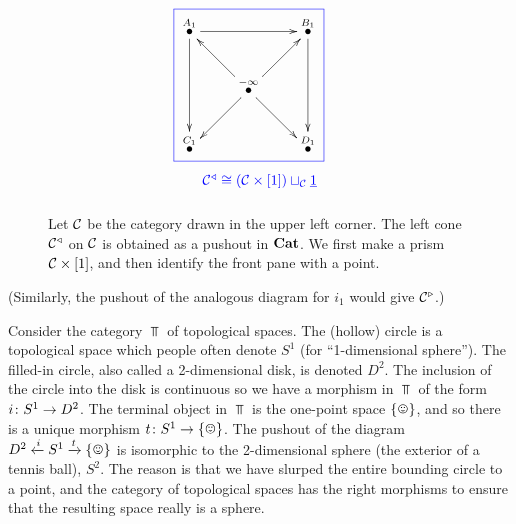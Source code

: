 \documentclass[CT4S-EN-RU]{subfiles}
\begin{document}
\begin{exampleENG}
\begin{figure}[H]
$$\parbox{1.7in}{\cfbox{blue}{\parbox{1.7in}{
\xymatrix{
\LMO{A_1}\ar[rr]\ar[dd]&&\LMO{B_1}\ar[dd]\\
&\LMO{-\infty}\ar[ur]\ar[dr]\ar[ul]\ar[dl]\\
\LMO{C_1}&&\LMO{D_1}}}}\begin{center}\color{blue}{$\mcC\lcone\iso(\mcC\times[1])\sqcup_{\mcC}\ul{1}$}\end{center}}
$$
\caption{Let $\mathcal{C}$ be the category drawn in the upper left corner. The left cone $\mathcal{C}^\triangleleft$ on $\mathcal{C}$ is obtained as a pushout in ${\mathbf{Cat}}$. We first make a prism $\mathcal{C}\times[1]$, and then identify the front pane with a point.}
\label{fig:left cone}
\end{figure}
(Similarly, the pushout of the analogous diagram for $i_1$ would give $\mathcal{C}^\triangleright$.)
\end{exampleENG}

\begin{exampleRUS}
\end{exampleRUS}

\begin{exampleENG}\label{ex:pushout in Top}
Consider the category $\Top$ of topological spaces. The (hollow) circle is a topological space which people often denote $S^1$ (for “1-dimensional sphere”). The filled-in circle, also called a 2-dimensional disk, is denoted $D^2$. The inclusion of the circle into the disk is continuous so we have a morphism in $\Top$ of the form $i\colon S^1\rightarrow D^2$. The terminal object in $\Top$ is the one-point space $\singleton$, and so there is a unique morphism $t\taking S^1\to\singleton$. The pushout of the diagram $D^2\From{i}S^1\To{t}\singleton$ is isomorphic to the 2-dimensional sphere (the exterior of a tennis ball), $S^2$. The reason is that we have slurped the entire bounding circle to a point, and the category of topological spaces has the right morphisms to ensure that the resulting space really is a sphere. 
\end{exampleENG}

\begin{exampleRUS}\label{ex:pushout in Top}
\end{exampleRUS}
\end{document}
